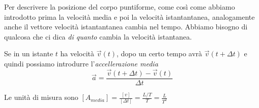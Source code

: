Per descrivere la posizione del corpo puntiforme, come
così come abbiamo introdotto prima la velocità media e poi la
velocità istantantanea, analogamente anche il vettore velocità istantantanea
cambia nel tempo. Abbiamo bisogno di qualcosa che ci dica \textit{di quanto}
cambia la velocità istantanea. 


Se in un istante $t$ ha velocità $\overrightarrow{v}(t)$, 
dopo un certo tempo avrà  $\overrightarrow{v}(t +\Delta t)$ e quindi 
possiamo introdurre l'\textit{accellerazione media}
\begin{equation}
    \overrightarrow{a}=
    \frac{\overrightarrow{v}(t +\Delta t) - \overrightarrow{v}(t)}{\Delta t} 
\end{equation}

Le unità di misura sono
 $[A_{media}]=\frac{[v]}{[\Delta t]}= \frac{L/T}{T}=\frac{L}{T^2}$




